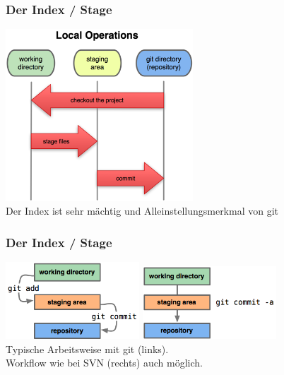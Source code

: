 \begin{frame}
  \frametitle{Der Index / Stage}
  \vspace{-0.3cm}
  \begin{center}
    \includegraphics[width=7cm]{img/staging.png} \\
    Der Index ist sehr mächtig und Alleinstellungsmerkmal von git
  \end{center}
\end{frame}

\begin{frame}
  \frametitle{Der Index / Stage}
  \begin{center}
    \includegraphics[width=5cm]{img/index1.png} \hspace{0.5cm} \includegraphics[width=5cm]{img/index2.png} \\
    \vspace{1cm}
    Typische Arbeitsweise mit git (links). \\ Workflow wie bei SVN (rechts) auch möglich.
  \end{center}
\end{frame}

